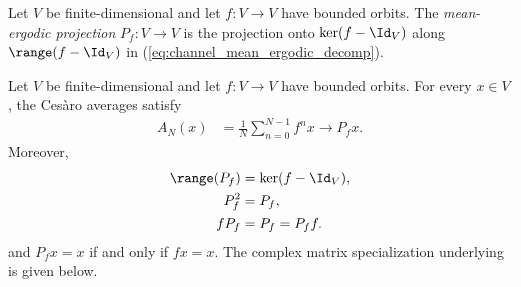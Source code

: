 \begin{definition}
    \label{def:mean_ergodic_projection}
    \leanok
    Let $V$ be finite-dimensional and let $f:V\to V$ have bounded orbits.
    The \emph{mean-ergodic projection} $P_f:V\to V$ is the projection onto
    $\ker(f-\Id_V)$ along $\range(f-\Id_V)$ in
    (\ref{eq:channel_mean_ergodic_decomp}).
\end{definition}

\begin{theorem}
    \label{thm:mean_ergodic_bounded_orbits}
    \leanok
    Let $V$ be finite-dimensional and let $f:V\to V$ have bounded orbits.
    For every $x\in V$, the Ces\`aro averages satisfy
    \begin{align}
        A_N(x)
         & =\frac{1}{N}\sum_{n=0}^{N-1}f^nx
        \longrightarrow P_fx.
        \label{eq:channel_mean_ergodic_limit}
    \end{align}
    Moreover,
    \begin{align}
        \range(P_f) & =\ker(f-\Id_V), \notag \\
        P_f^2       & =P_f, \notag           \\
        fP_f        & =P_f=P_ff.
        \label{eq:channel_mean_ergodic_properties}
    \end{align}
    and $P_fx=x$ if and only if $fx=x$.
    The complex matrix specialization underlying
    \cite[Equation~(6.14)]{Wolf2012Quantum} is given below.
\end{theorem}

